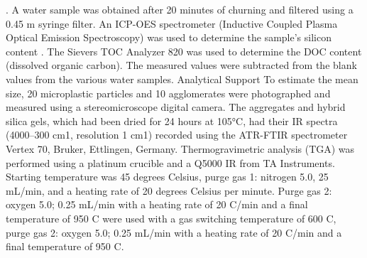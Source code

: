 \documentclass[12pt]{article}
\begin{document}
. A water sample was obtained after 20 minutes of churning and filtered using a 0.45 m syringe filter. An ICP-OES spectrometer (Inductive Coupled Plasma Optical Emission Spectroscopy) was used to determine the sample's silicon content . The Sievers TOC Analyzer 820 was used to determine the DOC content (dissolved organic carbon). The measured values were subtracted from the blank values from the various water samples. Analytical Support To estimate the mean size, 20 microplastic particles and 10 agglomerates were photographed and measured using a stereomicroscope digital camera. 
The aggregates and hybrid silica gels, which had been dried for 24 hours at 105°C, had their IR spectra (4000–300 cm1, resolution 1 cm1) recorded using the ATR-FTIR spectrometer Vertex 70, Bruker, Ettlingen, Germany. Thermogravimetric analysis (TGA) was performed using a platinum crucible and a Q5000 IR from TA Instruments. Starting temperature was 45 degrees Celsius, purge gas 1: nitrogen 5.0, 25 mL/min, and a heating rate of 20 degrees Celsius per minute. Purge gas 2: oxygen 5.0; 0.25 mL/min with a heating rate of 20 C/min and a final temperature of 950 C were used with a gas switching temperature of 600 C, purge gas 2: oxygen 5.0; 0.25 mL/min with a heating rate of 20 C/min and a final temperature of 950 C.

\clearpage
\end{document}
